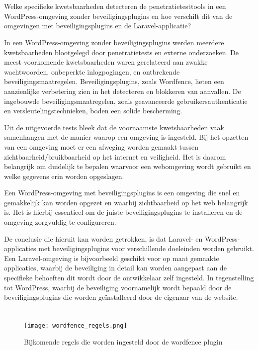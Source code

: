   \section{}  
   Welke specifieke kwetsbaarheden detecteren de penetratietesttools in een WordPress-omgeving zonder beveiligingsplugins en 
   hoe verschilt dit van de omgevingen met beveiligingsplugins en de Laravel-applicatie?
  
  In een WordPress-omgeving zonder beveiligingsplugins werden meerdere kwetsbaarheden blootgelegd door penetratietests en 
  externe onderzoeken. De meest voorkomende kwetsbaarheden waren gerelateerd aan zwakke wachtwoorden, onbeperkte 
  inlogpogingen, en ontbrekende beveiligingsmaatregelen. Beveiligingsplugins, zoals Wordfence, lieten een aanzienlijke 
  verbetering zien in het detecteren en blokkeren van aanvallen. De ingebouwde beveiligingsmaatregelen, zoals geavanceerde 
  gebruikersauthenticatie en versleutelingstechnieken, boden een solide bescherming.

  Uit de uitgevoerde tests bleek dat de voornaamste kwetsbaarheden vaak samenhangen met de manier waarop een omgeving is 
  ingesteld. Bij het opzetten van een omgeving moet er een afweging worden gemaakt tussen zichtbaarheid/bruikbaarheid op het 
  internet en veiligheid. Het is daarom belangrijk om duidelijk te bepalen waarvoor een webomgeving wordt gebruikt en welke 
  gegevens erin worden opgeslagen.

  Een WordPress-omgeving met beveiligingsplugins is een omgeving die snel en gemakkelijk kan worden opgezet en waarbij 
  zichtbaarheid op het web belangrijk is. Het is hierbij essentieel om de juiste beveiligingsplugins te installeren en de 
  omgeving zorgvuldig te configureren.

  De conclusie die hieruit kan worden getrokken, is dat Laravel- en WordPress-applicaties met beveiligingsplugins voor 
  verschillende doeleinden worden gebruikt. Een Laravel-omgeving is bijvoorbeeld geschikt voor op maat gemaakte applicaties, 
  waarbij de beveiliging in detail kan worden aangepast aan de specifieke behoeften dit wordt door de ontwikkelaar zelf 
  ingesteld. In tegenstelling tot WordPress, waarbij de beveiliging voornamelijk wordt bepaald door de beveiligingsplugins 
  die worden geïnstalleerd door de eigenaar van de website.

  \section{}  
  \begin{figure}
    \centering
    \texttt{[image: wordfence\_regels.png]}
    \caption[Bijkomende regels die worden ingesteld door de wordfence plugin]{Bijkomende regels die worden ingesteld door de wordfence plugin}
    \label{fig:wordfence_regels}
  \end{figure}

